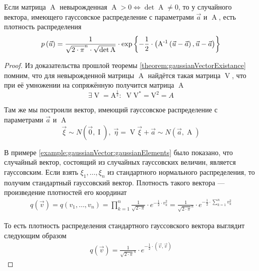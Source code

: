 \begin{theorem}
  \label{theorem:gaussianVector:dencity}
  Если матрица $\operatorname{A}$ невырожденная
  $\operatorname{A} > 0 \Leftrightarrow \det{\operatorname{A}} \neq 0$,
  то у случайного вектора, имеющего гауссовское распределение с параметрами
  $\vec{a}$ и $\operatorname{A}$, есть плотность распределения
  $$p\left(\vec{u}\right)
      = \frac{1}{\sqrt{2 \cdot \pi}^n \cdot \sqrt{\det{\operatorname{A}}}}
      \cdot \exp{\left\{ -\frac{1}{2} \cdot \left(
          \operatorname{A^{-1}} \left( \vec{u} - \vec{a} \right),
          \vec{u} - \vec{a} \right) \right\}}$$
\end{theorem}
\begin{proof}
  Из доказательства прошлой теоремы \ref{theorem:gaussianVectorExistance}
  помним, что для невырожденной матрицы $\operatorname{A}$ найдётся такая
  матрица $\operatorname{V}$, что при её умножении на сопряжённую получится
  матрица $\operatorname{A}$
  $$\exists \operatorname{V} = \operatorname{A^{\frac{1}{2}}}:\;
      \operatorname{V}\operatorname{V^*} = \operatorname{V^2} = A$$

  Там же мы построили вектор, имеющий гауссовское распределение с параметрами
  $\vec{a}$ и $\operatorname{A}$
  $$\vec{\xi} \sim N\left( \vec{0}, \operatorname{I} \right),\;
      \vec{\eta} = \operatorname{V} \vec{\xi} + \vec{a}
      \sim N\left( \vec{a}, \operatorname{A} \right)$$

  В примере \ref{example:gaussianVector:gaussianElements} было показано, что
  случайный вектор, состоящий из случайных гауссовских величин, является
  гауссовским. Если взять $\xi_1, \dots, \xi_n$ из стандартного нормального
  распределения, то получим стандартный гауссовский вектор. Плотность такого
  вектора --- произведение плотностей его координат
  \begin{align*}
      q\left( \vec{v} \right)
      = q\left( v_1, \dots, v_n \right)
      = \prod_{k=1}^n \frac{1}{\sqrt{2 \cdot \pi}}
      \cdot e^{-\frac{1}{2} \cdot v_k^2}
      = \frac{1}{\sqrt{2 \cdot \pi}^n}
      \cdot e^{-\frac{1}{2} \cdot \sum_{k=1}^n v_k^2}
  \end{align*}

  То есть плотность распределения стандартного гауссовского вектора выглядит
  следующим образом
  \begin{align*}
      q\left( \vec{v} \right)
      = \frac{1}{\sqrt{2 \cdot \pi}^n}
      \cdot e^{-\frac{1}{2} \cdot \left( \vec{v}, \vec{v} \right)}
  \end{align*}


\end{proof}
